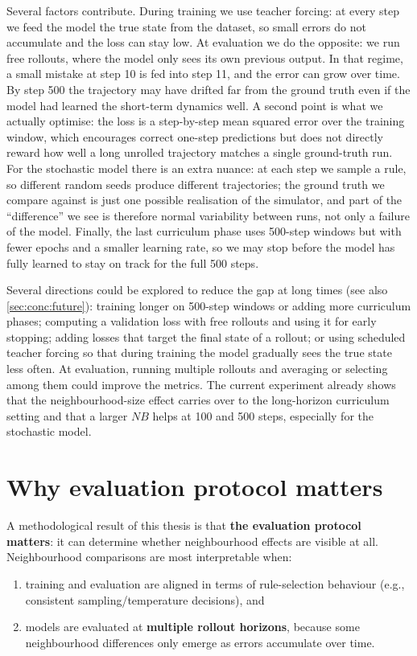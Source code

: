 Several factors contribute.
During training we use teacher forcing: at every step we feed the model the true state from the dataset, so small errors do not accumulate and the loss can stay low.
At evaluation we do the opposite: we run free rollouts, where the model only sees its own previous output. In that regime, a small mistake at step 10 is fed into step 11, and the error can grow over time. By step 500 the trajectory may have drifted far from the ground truth even if the model had learned the short-term dynamics well.
A second point is what we actually optimise: the loss is a step-by-step mean squared error over the training window, which encourages correct one-step predictions but does not directly reward how well a long unrolled trajectory matches a single ground-truth run.
For the stochastic model there is an extra nuance: at each step we sample a rule, so different random seeds produce different trajectories; the ground truth we compare against is just one possible realisation of the simulator, and part of the ``difference'' we see is therefore normal variability between runs, not only a failure of the model.
Finally, the last curriculum phase uses 500-step windows but with fewer epochs and a smaller learning rate, so we may stop before the model has fully learned to stay on track for the full 500 steps.

Several directions could be explored to reduce the gap at long times (see also \cref{sec:conc:future}): training longer on 500-step windows or adding more curriculum phases; computing a validation loss with free rollouts and using it for early stopping; adding losses that target the final state of a rollout; or using scheduled teacher forcing so that during training the model gradually sees the true state less often.
At evaluation, running multiple rollouts and averaging or selecting among them could improve the metrics.
The current experiment already shows that the neighbourhood-size effect carries over to the long-horizon curriculum setting and that a larger \(NB\) helps at 100 and 500 steps, especially for the stochastic model.

\section{Why evaluation protocol matters}
\label{sec:results:evaluation}

A methodological result of this thesis is that \textbf{the evaluation protocol matters}: it can determine whether neighbourhood effects are visible at all. Neighbourhood comparisons are most interpretable when:
\begin{enumerate}
\item training and evaluation are aligned in terms of rule-selection behaviour (e.g., consistent sampling/temperature decisions), and
\item models are evaluated at \textbf{multiple rollout horizons}, because some neighbourhood differences only emerge as errors accumulate over time.
\end{enumerate}

